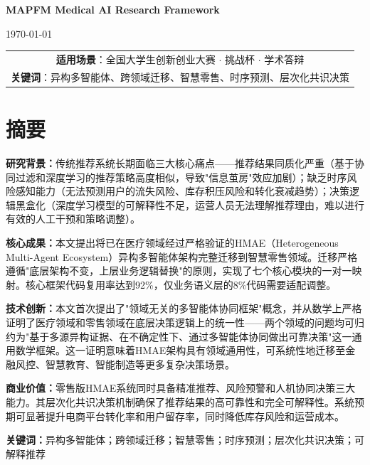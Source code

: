 \documentclass[11pt,a4paper]{ctexart}
\theoremstyle{remark}
\begin{document}
\begin{titlepage}
{\large \textbf{MAPFM Medical AI Research Framework}}

\vspace{0.6cm}

{\normalsize \today}

\vspace{1.5cm}

{\small
\begin{tabular}{c}
\hline
\textbf{适用场景}：全国大学生创新创业大赛 $\cdot$ 挑战杯 $\cdot$ 学术答辩 \\
\textbf{关键词}：异构多智能体、跨领域迁移、智慧零售、时序预测、层次化共识决策 \\
\hline
\end{tabular}
}

\end{titlepage}

\section*{摘\quad 要}

\textbf{研究背景：}传统推荐系统长期面临三大核心痛点——推荐结果同质化严重（基于协同过滤和深度学习的推荐策略高度相似，导致"信息茧房"效应加剧）；缺乏时序风险感知能力（无法预测用户的流失风险、库存积压风险和转化衰减趋势）；决策逻辑黑盒化（深度学习模型的可解释性不足，运营人员无法理解推荐理由，难以进行有效的人工干预和策略调整）。

\textbf{核心成果：}本文提出将已在医疗领域经过严格验证的HMAE（Heterogeneous Multi-Agent Ecosystem）异构多智能体架构完整迁移到智慧零售领域。迁移严格遵循"底层架构不变，上层业务逻辑替换"的原则，实现了七个核心模块的一对一映射。核心框架代码复用率达到92\%，仅业务语义层的8\%代码需要适配调整。

\textbf{技术创新：}本文首次提出了"领域无关的多智能体协同框架"概念，并从数学上严格证明了医疗领域和零售领域在底层决策逻辑上的统一性——两个领域的问题均可归约为"基于多源异构证据、在不确定性下、通过多智能体协同做出可靠决策"这一通用数学框架。这一证明意味着HMAE架构具有领域通用性，可系统性地迁移至金融风控、智慧教育、智能制造等更多复杂决策场景。

\textbf{商业价值：}零售版HMAE系统同时具备精准推荐、风险预警和人机协同决策三大能力。其层次化共识决策机制确保了推荐结果的高可靠性和完全可解释性。系统预期可显著提升电商平台转化率和用户留存率，同时降低库存风险和运营成本。

\vspace{1em}
\noindent\textbf{关键词：}异构多智能体；跨领域迁移；智慧零售；时序预测；层次化共识决策；可解释推荐
\end{document}
